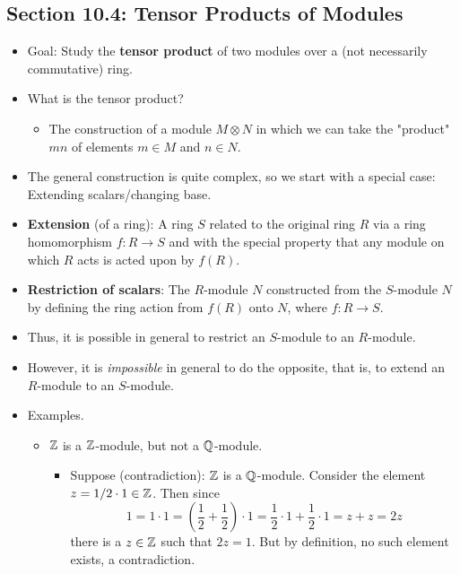 \documentclass[../notes.tex]{subfiles}
\begin{document}
\subsection*{Section 10.4: Tensor Products of Modules}
\begin{itemize}
    \item {}Goal: Study the \textbf{tensor product} of two modules over a (not necessarily commutative) ring.
    \item What is the tensor product?
    \begin{itemize}
        \item The construction of a module $M\otimes N$ in which we can take the "product" $mn$ of elements $m\in M$ and $n\in N$.
    \end{itemize}
    \item The general construction is quite complex, so we start with a special case: Extending scalars/changing base.
    \item \textbf{Extension} (of a ring): A ring $S$ related to the original ring $R$ via a ring homomorphism $f:R\to S$ and with the special property that any module on which $R$ acts is acted upon by $f(R)$.
    \item \textbf{Restriction of scalars}: The $R$-module $N$ constructed from the $S$-module $N$ by defining the ring action from $f(R)$ onto $N$, where $f:R\to S$.
    \item Thus, it is possible in general to restrict an $S$-module to an $R$-module.
    \item However, it is \emph{impossible} in general to do the opposite, that is, to extend an $R$-module to an $S$-module.
    \item Examples.
    \begin{itemize}
        \item $\mathbb{Z}$ is a $\mathbb{Z}$-module, but not a $\mathbb{Q}$-module.
        \begin{itemize}
            \item Suppose (contradiction): $\mathbb{Z}$ is a $\mathbb{Q}$-module. Consider the element $z=1/2\cdot 1\in\mathbb{Z}$. Then since
            \begin{equation*}
                1 = 1\cdot 1
                = \left( \frac{1}{2}+\frac{1}{2} \right)\cdot 1
                = \frac{1}{2}\cdot 1+\frac{1}{2}\cdot 1
                = z+z
                = 2z
            \end{equation*}
            there is a $z\in\mathbb{Z}$ such that $2z=1$. But by definition, no such element exists, a contradiction.
        \end{itemize}

\end{itemize}
\end{itemize}
\end{document}
